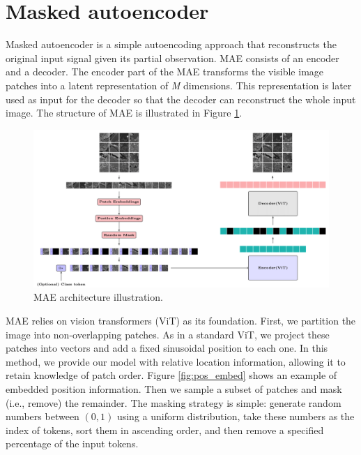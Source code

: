 \documentclass[11pt,titlepage,openright]{book}
\begin{document}
\section{Masked autoencoder}

Masked autoencoder is a simple autoencoding approach that reconstructs the original input signal given its partial observation. MAE consists of an encoder and a decoder. The encoder part of the MAE transforms the visible image patches into a latent representation of \textit{M} dimensions. This representation is later used as input for the decoder so that the decoder can reconstruct the whole input image. The structure of MAE is illustrated in Figure \ref{fig:MAE}.

\begin{figure}[t]
  \centering
  \vspace*{1em}
  \includegraphics[width=1.0\linewidth]{Figures/model_structure.png}
  \vspace*{1em}
  \caption{MAE architecture illustration.}
  \label{fig:MAE}
\end{figure}

MAE relies on vision transformers (ViT) \citep{dosovitskiy2020image} as its foundation. First, we partition the image into non-overlapping patches. As in a standard ViT, we project these patches into vectors and add a fixed sinusoidal position \citep{vaswani2017attention} to each one. In this method, we provide our model with relative location information, allowing it to retain knowledge of patch order. Figure \ref{fig:pos_embed} shows an example of embedded position information. Then we sample a subset of patches and mask (i.e., remove) the remainder. The masking strategy is simple: generate random numbers between $(0, 1)$ using a uniform distribution, take these numbers as the index of tokens, sort them in ascending order, and then remove a specified percentage of the input tokens.
\end{document}
